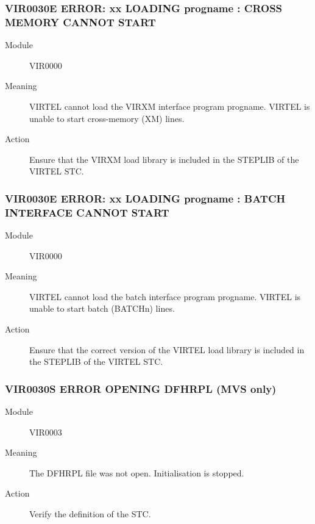 \documentclass[letterpaper,10pt,english]{sphinxmanual}
\begin{document}
\subsubsection{VIR0030E ERROR: xx LOADING progname : CROSS MEMORY CANNOT START}
\label{\detokenize{messages:vir0030e-error-xx-loading-progname-cross-memory-cannot-start}}\begin{description}
\item[{Module}] \leavevmode
VIR0000

\item[{Meaning}] \leavevmode
VIRTEL cannot load the VIRXM interface program progname. VIRTEL is unable to start cross-memory (XM) lines.

\item[{Action}] \leavevmode
Ensure that the VIRXM load library is included in the STEPLIB of the VIRTEL STC.

\end{description}


\subsubsection{VIR0030E ERROR: xx LOADING progname : BATCH INTERFACE CANNOT START}
\label{\detokenize{messages:vir0030e-error-xx-loading-progname-batch-interface-cannot-start}}\begin{description}
\item[{Module}] \leavevmode
VIR0000

\item[{Meaning}] \leavevmode
VIRTEL cannot load the batch interface program progname. VIRTEL is unable to start batch (BATCHn) lines.

\item[{Action}] \leavevmode
Ensure that the correct version of the VIRTEL load library is included in the STEPLIB of the VIRTEL STC.

\end{description}


\subsubsection{VIR0030S ERROR OPENING DFHRPL (MVS only)}
\label{\detokenize{messages:vir0030s-error-opening-dfhrpl-mvs-only}}\begin{description}
\item[{Module}] \leavevmode
VIR0003

\item[{Meaning}] \leavevmode
The DFHRPL file was not open. Initialisation is stopped.

\item[{Action}] \leavevmode
Verify the definition of the STC.

\end{description}
\end{document}
